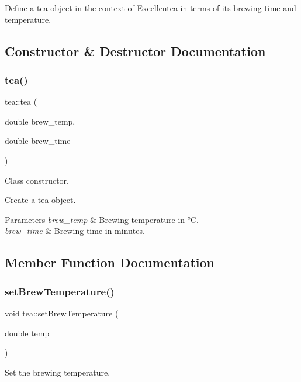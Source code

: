 Define a tea object in the context of Excellentea in terms of its brewing time and temperature. 

\subsection{Constructor \& Destructor Documentation}
\mbox{\label{classtea_ae5f444d5215b49aae039b46a47ad908f}} 
\subsubsection{\texorpdfstring{tea()}{tea()}}
{\footnotesize\ttfamily tea\+::tea (\begin{DoxyParamCaption}\item[{double}]{brew\+\_\+temp,  }\item[{double}]{brew\+\_\+time }\end{DoxyParamCaption})}



Class constructor. 

Create a tea object. 
\begin{DoxyParams}{Parameters}
{\em brew\+\_\+temp} & Brewing temperature in °C. \\
\hline
{\em brew\+\_\+time} & Brewing time in minutes. \\
\hline
\end{DoxyParams}


\subsection{Member Function Documentation}
\mbox{\label{classtea_a6853c9899596abea3121aae76b12e5f6}} 
\subsubsection{\texorpdfstring{set\+Brew\+Temperature()}{setBrewTemperature()}}
{\footnotesize\ttfamily void tea\+::set\+Brew\+Temperature (\begin{DoxyParamCaption}\item[{double}]{temp }\end{DoxyParamCaption})}



Set the brewing temperature. 


